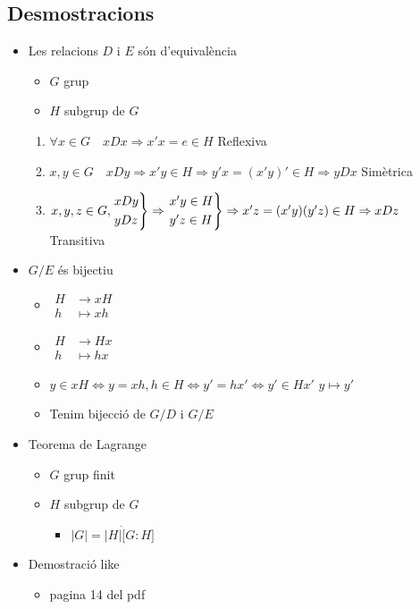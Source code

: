 \subsection*{Desmostracions}
\begin{itemize}
\item Les relacions $D$ i $E$ són d'equivalència
	\begin{itemize}
	\item $G$ grup
	\item $H$ subgrup de $G$
	\end{itemize}
	\begin{enumerate}
	\item $\forall x \in G\quad xDx \Rightarrow x'x = e \in H$ Reflexiva
	\item $x, y \in G\quad xDy \Rightarrow x'y \in H \Rightarrow y'x = (x'y)' \in H \Rightarrow yDx$ Simètrica
	\item $x, y, z \in G,
		\begin{rcases}
		xDy\\
		yDz
		\end{rcases}
		\Rightarrow
		\begin{rcases}
		x'y \in H\\
		y'z \in H
		\end{rcases}
		\Rightarrow
		x'z = (x'y)(y'z) \in H \Rightarrow xDz
		$ Transitiva
	\end{enumerate}
\item $G/E$ és bijectiu
	\begin{itemize}
	\item $
		\begin{array}{cc}
		H & \to xH \\
		h & \mapsto xh
		\end{array}
		$
	\item $
		\begin{array}{cc}
		H & \to Hx \\
		h & \mapsto hx
		\end{array}
		$
	\item $y \in xH \Leftrightarrow y = xh, h \in H \Leftrightarrow y' = hx' \Leftrightarrow y' \in Hx'$
		\subitem $y \mapsto y'$
	\item Tenim bijecció de $G/D$ i $G/E$
	\end{itemize}
\item Teorema de Lagrange
	\begin{itemize}
	\item $G$ grup finit
	\item $H$ subgrup de $G$
		\begin{itemize}
		\item $|G| = |H|\dot [G:H]$
		\end{itemize}
	\end{itemize}
\item Demostració like
	\begin{itemize}
	\item pagina 14 del pdf
	\end{itemize}
\end{itemize}

